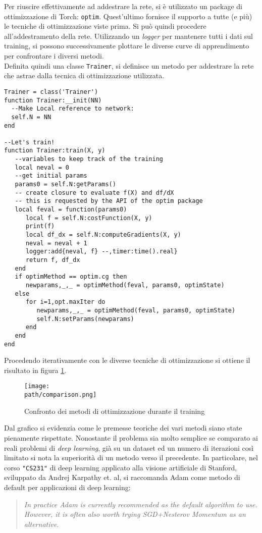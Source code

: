Per riuscire effettivamente ad addestrare la rete, si è utilizzato un package di ottimizzazione di Torch: \texttt{optim}. Quest'ultimo fornisce il supporto a tutte (e più) le tecniche di ottimizzazione viste prima. 
Si può quindi procedere all'addestramento della rete. Utilizzando un \emph{logger} per mantenere tutti i dati sul training, si possono successivamente plottare le diverse curve di apprendimento per confrontare i diversi metodi. \\
Definita quindi una classe \texttt{Trainer}, si definisce un metodo per addestrare la rete che astrae dalla tecnica di ottimizzazione utilizzata. 
\begin{lstlisting}[language={[5.2]Lua}]
Trainer = class('Trainer')
function Trainer:__init(NN)
  --Make Local reference to network:
  self.N = NN
end

--Let's train!
function Trainer:train(X, y)
   --variables to keep track of the training
   local neval = 0
   --get initial params
   params0 = self.N:getParams()
   -- create closure to evaluate f(X) and df/dX
   -- this is requested by the API of the optim package
   local feval = function(params0)
      local f = self.N:costFunction(X, y)
      print(f)
      local df_dx = self.N:computeGradients(X, y)
      neval = neval + 1
      logger:add{neval, f} --,timer:time().real}
      return f, df_dx
   end
   if optimMethod == optim.cg then
      newparams,_,_ = optimMethod(feval, params0, optimState)
   else
      for i=1,opt.maxIter do
         newparams,_,_ = optimMethod(feval, params0, optimState)
         self.N:setParams(newparams)
      end
   end
end
\end{lstlisting}

Procedendo iterativamente con le diverse tecniche di ottimizzazione si ottiene il risultato in figura \ref{fig:comparison}. 

\begin{figure}[h!]
 \centering
 \texttt{[image: \\path/comparison.png]}
 \caption{Confronto dei metodi di ottimizzazione durante il training}
 \label{fig:comparison}
\end{figure}
Dal grafico si evidenzia come le premesse teoriche dei vari metodi siano state pienamente rispettate. Nonostante il problema sia molto semplice se comparato ai reali problemi di \emph{deep learning}, già su un dataset ed un numero di iterazioni così limitato si nota la superiorità di un metodo verso il precedente. In particolare, nel corso \texttt{"CS231"} di deep learning applicato alla visione artificiale di Stanford\parencite{WCS231adam}, sviluppato da Andrej Karpathy et. al, si raccomanda Adam come metodo di default per applicazioni di deep learning: 
\begin{quote}
\emph{In practice Adam is currently recommended as the default algorithm to use. However, it is often also worth trying SGD+Nesterov Momentum as an alternative}.
\end{quote}

